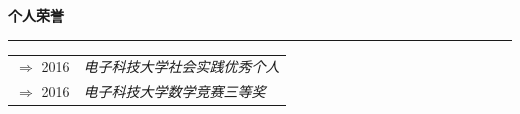 \documentclass[a4paper,11pt,final]{memoir}
\newcommand{\SmallSep}{\vspace{0.9em}}
\newcommand{\CVSection}[1]
	{\Large\textbf{#1}\par
	\vspace{0.2cm}\normalsize\normalfont}
\begin{document}
\begin{CJK*}{UTF8}{gbsn}
\CVSection{个人荣誉}
\hrule
\SmallSep
	\begin{tabular}{l|l}
		$\Rightarrow$ 2016&\textit{电子科技大学社会实践优秀个人}\footnotesize\\
		$\Rightarrow$ 2016&\textit{电子科技大学数学竞赛三等奖}\\
	\end{tabular}

\end{CJK*}
\end{document}
